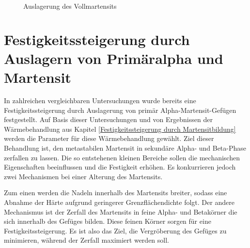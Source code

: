 \documentclass[a4paper, 11pt]{tubsreprt}
\begin{document}
\begin{figure}
\caption{Auslagerung des Vollmartensits}
\label{Auslagerung des Vollmartensits}
\end{figure}




\section{Festigkeitssteigerung durch Auslagern von Primäralpha und Martensit}\label{Primäralpha und martensit}
In zahlreichen vergleichbaren Untersuchungen wurde bereits eine Festigkeitssteigerung durch Auslagerung von primär Alpha-Martensit-Gefügen festgestellt. Auf Basis dieser Untersuchungen und von Ergebnissen der Wärmebehandlung aus Kapitel \ref{Festigkeitssteigerung durch Martensitbildung} werden die Parameter für diese Wärmebehandlung gewählt. Ziel dieser Behandlung ist, den metastabilen Martensit in sekundäre Alpha- und Beta-Phase zerfallen zu lassen. Die so entstehenen kleinen Bereiche sollen die mechanischen Eigenschaften beeinflussen und die Festigkeit erhöhen\cite{Gilbert2004}. Es konkurrieren jedoch zwei Mechanismen bei einer Alterung des Martensits. 




Zum einen werden die Nadeln innerhalb des Martensits breiter, sodass eine Abnahme der Härte aufgrund geringerer Grenzflächendichte folgt. Der andere Mechanismus ist der Zerfall des Martensits in feine Alpha- und Betakörner die sich innerhalb des Gefüges bilden. Diese feinen Körner sorgen für eine Festigkeitssteigerung. Es ist also das Ziel, die Vergröberung des Gefüges zu minimieren, während der Zerfall maximiert werden soll. 
\end{document}
